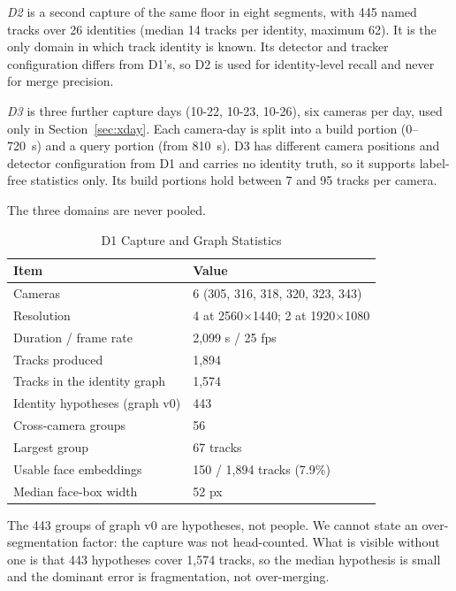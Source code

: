 \documentclass[journal]{IEEEtran}
\begin{document}
\emph{D2} is a second capture of the same floor in eight segments, with 445 named tracks over 26 identities (median 14 tracks per identity, maximum 62). It is the only domain in which track identity is known. Its detector and tracker configuration differs from D1's, so D2 is used for identity-level recall and never for merge precision.

\emph{D3} is three further capture days (10-22, 10-23, 10-26), six cameras per day, used only in Section~\ref{sec:xday}. Each camera-day is split into a build portion (0--720~s) and a query portion (from 810~s). D3 has different camera positions and detector configuration from D1 and carries no identity truth, so it supports label-free statistics only. Its build portions hold between 7 and 95 tracks per camera.

The three domains are never pooled.

\begin{table}[t]
\caption{D1 Capture and Graph Statistics}\label{tab:d1}
\centering
\begin{tabular}{@{}ll@{}}
\toprule
Item & Value\\
\midrule
Cameras & 6 (305, 316, 318, 320, 323, 343)\\
Resolution & 4 at 2560$\times$1440; 2 at 1920$\times$1080\\
Duration / frame rate & 2,099 s / 25 fps\\
Tracks produced & 1,894\\
Tracks in the identity graph & 1,574\\
Identity hypotheses (graph v0) & 443\\
Cross-camera groups & 56\\
Largest group & 67 tracks\\
Usable face embeddings & 150 / 1,894 tracks (7.9\%)\\
Median face-box width & 52 px\\
\bottomrule
\end{tabular}
\end{table}

The 443 groups of graph v0 are hypotheses, not people. We cannot state an over-segmentation factor: the capture was not head-counted. What is visible without one is that 443 hypotheses cover 1,574 tracks, so the median hypothesis is small and the dominant error is fragmentation, not over-merging.
\end{document}
